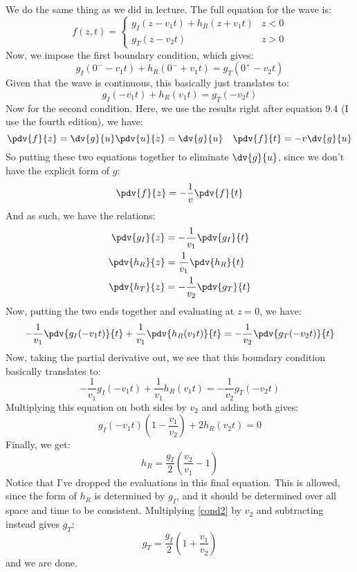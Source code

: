 \documentclass[10pt]{article}
\begin{document}
\begin{enumerate}[label=(\alph*)]
			\begin{solution}
				We do the same thing as we did in lecture. The full equation for the wave is:
				\[
					f(z, t) = \begin{cases}
						g_I(z - v_1t) + h_R(z + v_1t) & z < 0\\
						g_T(z - v_2t) & z > 0
					\end{cases}
				\]
				Now, we impose the first boundary condition, which gives:
				\[
					g_I(0^{-} - v_1t) + h_R(0^{-} + v_1t) = g_T(0^{+} - v_2t)
				\]
				Given that the wave is continuous, this basically just translates to:
				\begin{equation}
					\label{cond1}
					g_{I}(-v_1t) + h_R(v_1t) = g_T(-v_2t)
				\end{equation}
				Now for the second condition. Here, we use the results right after equation 9.4 (I use the
				fourth edition), we have:
				\[
					\pdv{f}{z} = \dv{g}{u} \pdv{u}{z} = \dv{g}{u} \quad \pdv{f}{t} = -v\dv{g}{u}
				\]
				So putting these two equations together to eliminate \( \dv{g}{u} \), since we don't have the
				explicit form of \( g \):
				\[
					\pdv{f}{z} = -\frac{1}{v}\pdv{f}{t}
				\]
				And as such, we have the relations:
				\begin{align*}
					\pdv{g_I}{z} &= -\frac{1}{v_1}\pdv{g_I}{t}\\
					\pdv{h_R}{z} &= \frac{1}{v_1}\pdv{h_R}{t} \\ 
					\pdv{h_T}{z} &= -\frac{1}{v_2}\pdv{g_T}{t} \\ 
				\end{align*}
				Now, putting the two ends together and evaluating at \( z = 0 \), we have:
				\[
					-\frac{1}{v_1}\pdv{g_I(-v_1t)}{t} + \frac{1}{v_1} \pdv{h_R(v_1t)}{t} 
					= -\frac{1}{v_2}\pdv{g_T(-v_2t)}{t} 
				\]
				Now, taking the partial derivative out, we see that this boundary condition basically
				translates to:
				\begin{equation}
					\label{cond2}
					-\frac{1}{v_1}g_I(-v_1t) + \frac{1}{v_1}h_R(v_1t) = -\frac{1}{v_2} g_T(-v_2t)
				\end{equation}
				Multiplying this equation on both sides by \( v_2 \) and adding both gives:
				\[
					g_I(-v_1t) \left( 1 - \frac{v_1}{v_2} \right) + 2h_R(v_2t) = 0
				\]
				Finally, we get:
				\[
					h_R = \frac{g_I}{2}\left( \frac{v_2}{v_1} - 1 \right)
				\]
				Notice that I've dropped the evaluations in this final equation. This is allowed, since the
				form of \( h_R \) is determined by \( g_I \), and it should be determined over all space and
				time to be consistent. Multiplying \ref{cond2} by \( v_2 \) and subtracting instead gives \(
				g_T\):
				\[
					g_T = \frac{g_I}{2}\left( 1 + \frac{v_1}{v_2} \right)
				\]
				and we are done. 
			\end{solution}
	\end{enumerate}
\end{document}
